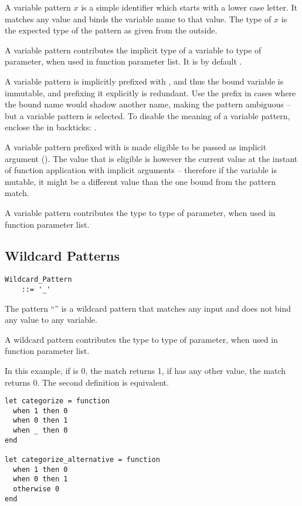 A variable pattern $x$ is a simple identifier which starts with a lower case letter. It matches any value and binds the variable name to that value. The type of $x$ is the expected type of the pattern as given from the outside. 

A variable pattern contributes the implicit type of a variable to type of parameter, when used in function parameter list. It is by default . 

A variable pattern is implicitly prefixed with , and thus the bound variable is immutable, and prefixing it explicitly is redundant. Use the  prefix in cases where the bound name would shadow another name, making the pattern ambiguous -- but a variable pattern is selected. To disable the meaning of a variable pattern, enclose the  in backticks: .

A variable pattern prefixed with  is made eligible to be passed as implicit argument (). The value that is eligible is however the current value at the instant of function application with implicit arguments -- therefore if the variable is mutable, it might be a different value than the one bound from the pattern match. 

A variable pattern contributes the type  to type of parameter, when used in function parameter list. 






\subsection{Wildcard Patterns}
\label{sec:wildcard-patterns}

\grammar\begin{lstlisting}
Wildcard_Pattern 
    ::= '_'
\end{lstlisting}

The pattern ``\code{_}'' is a wildcard pattern that matches any input and does not bind any value to any variable. 

A wildcard pattern contributes the type  to type of parameter, when used in function parameter list. 

\example In this example, if  is 0, the match returns 1, if  has any other value, the match returns 0. The second definition is equivalent. 
\begin{lstlisting}
let categorize = function
  when 1 then 0
  when 0 then 1
  when _ then 0
end

let categorize_alternative = function
  when 1 then 0
  when 0 then 1
  otherwise 0
end
\end{lstlisting}

